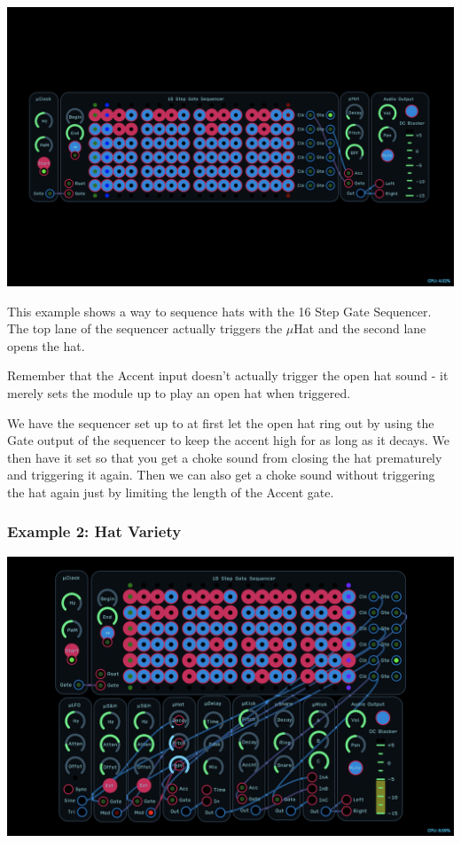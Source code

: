 \documentclass[11pt]{book}
\begin{document}
\begin{multicols*}{2}
\begin{center}
\includegraphics[width=0.95\linewidth]{uhat-fig2.png}
\end{center}

This example shows a way to sequence hats with the 16 Step Gate Sequencer. The top lane of the sequencer actually triggers the $\mu$Hat and the second lane opens the hat. 

Remember that the Accent input doesn't actually trigger the open hat sound - it merely sets the module up to play an open hat when triggered.

We have the sequencer set up to at first let the open hat ring out by using the Gate output of the sequencer to keep the accent high for as long as it decays. We then have it set so that you get a choke sound from closing the hat prematurely and triggering it again. Then we can also get a choke sound without triggering the hat again just by limiting the length of the Accent gate.

\subsubsection*{Example 2: Hat Variety}

\begin{center}
\includegraphics[width=0.95\linewidth]{uhat-fig3.png}
\end{center}


\end{multicols*}
\end{document}
